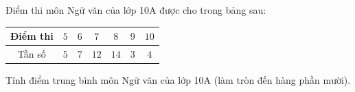 \begin{ex}
Điểm thi môn Ngữ văn của lớp 10A được cho trong bảng sau:
\begin{center}
\begin{tabular}{|c|c|c|c|c|c|c|}\hline
Điểm thi & $5$ & $6$ & $7$ & $8$ & $9$ & $10$\\\hline
Tần số & $5$ & $7$ & $12$ & $14$ & $3$ & $4$\\\hline
\end{tabular}
\end{center}
Tính điểm trung bình môn Ngữ văn của lớp 10A (làm tròn đến hàng phần mười).
\end{ex}
